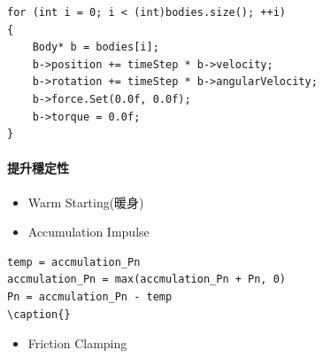 \begin{itemize}
\end{itemize}

\begin{lstlisting}  
for (int i = 0; i < (int)bodies.size(); ++i)
{
    Body* b = bodies[i];
    b->position += timeStep * b->velocity;
    b->rotation += timeStep * b->angularVelocity;
    b->force.Set(0.0f, 0.0f);
    b->torque = 0.0f;
}
\end{lstlisting}

\paragraph{提升穩定性}

\begin{itemize}
\item{Warm Starting(暖身)}
\end{itemize}

\begin{itemize}
    \item{Accumulation Impulse}
\end{itemize}

\begin{lstlisting} 
temp = accmulation_Pn
accmulation_Pn = max(accmulation_Pn + Pn, 0)
Pn = accmulation_Pn - temp
\caption{}
\end{lstlisting}

\begin{itemize}
    \item{Friction Clamping}
\end{itemize}
           
